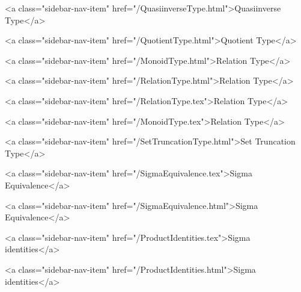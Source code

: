       
    
      
        
          <a class="sidebar-nav-item" href="/QuasiinverseType.html">Quasiinverse Type</a>
        
      
    
      
        
          <a class="sidebar-nav-item" href="/QuotientType.html">Quotient Type</a>
        
      
    
      
        
          <a class="sidebar-nav-item" href="/MonoidType.html">Relation Type</a>
        
      
    
      
        
          <a class="sidebar-nav-item" href="/RelationType.html">Relation Type</a>
        
      
    
      
        
          <a class="sidebar-nav-item" href="/RelationType.tex">Relation Type</a>
        
      
    
      
        
          <a class="sidebar-nav-item" href="/MonoidType.tex">Relation Type</a>
        
      
    
      
        
          <a class="sidebar-nav-item" href="/SetTruncationType.html">Set Truncation Type</a>
        
      
    
      
        
          <a class="sidebar-nav-item" href="/SigmaEquivalence.tex">Sigma Equivalence</a>
        
      
    
      
        
          <a class="sidebar-nav-item" href="/SigmaEquivalence.html">Sigma Equivalence</a>
        
      
    
      
        
          <a class="sidebar-nav-item" href="/ProductIdentities.tex">Sigma identities</a>
        
      
    
      
        
          <a class="sidebar-nav-item" href="/ProductIdentities.html">Sigma identities</a>
        
